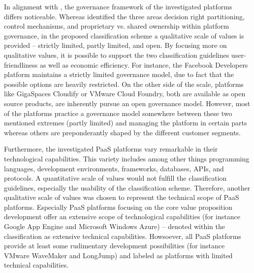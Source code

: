 In alignment with \citet{Tiwana2010}, the governance framework of the investigated platforms differs noticeable. Whereas \citet[pp. 679-681]{Tiwana2010} identified the three areas decision right partitioning, control mechanisms, and proprietary vs. shared ownership within platform governance, in the proposed classification scheme a qualitative scale of values is provided -- strictly limited, partly limited, and open. By focusing more on qualitative values, it is possible to support the two classification guidelines user-friendliness as well as economic efficiency. For instance, the Facebook Developers platform maintains a strictly limited governance model, due to fact that the possible options are heavily restricted. On the other side of the scale, platforms like GigaSpaces Cloudify or VMware Cloud Foundry, both are available as open source products, are inherently pursue an open governance model. However, most of the platforms practice a governance model somewhere between these two mentioned extremes (partly limited) and managing the platform in certain parts whereas others are preponderantly shaped by the different customer segments.

Furthermore, the investigated \ac{PaaS} platforms vary remarkable in their technological capabilities. This variety includes among other things programming languages, development environments, frameworks, databases, \acp{API}, and protocols. A quantitative scale of values would not fulfill the classification guidelines, especially the usability of the classification scheme. Therefore, another qualitative scale of values was chosen to represent the technical scope of \ac{PaaS} platforms. Especially \ac{PaaS} platforms focusing on the core value proposition development offer an extensive scope of technological capabilities (for instance Google App Engine and Microsoft Windows Azure) -- denoted within the classification as extensive technical capabilities. Howsoever, all \ac{PaaS} platforms provide at least some rudimentary development possibilities (for instance VMware WaveMaker and LongJump) and labeled as platforms with limited technical capabilities.


